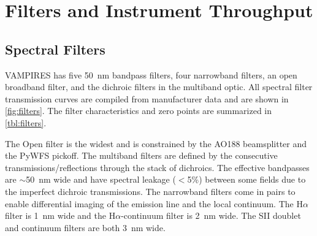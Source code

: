 \section{Filters and Instrument Throughput}\label{sec:filters}

\subsection{Spectral Filters}
VAMPIRES has five \SI{50}{\nm} bandpass filters, four narrowband filters, an open broadband filter, and the dichroic filters in the multiband optic. All spectral filter transmission curves are compiled from manufacturer data and are shown in \autoref{fig:filters}. The filter characteristics and zero points are summarized in \autoref{tbl:filters}.

The Open filter is the widest and is constrained by the AO188 beamsplitter and the PyWFS pickoff. The multiband filters are defined by the consecutive transmissions/reflections through the stack of dichroics. The effective bandpasses are $\sim$\SI{50}{\nm} wide and have spectral leakage ($<$5\%) between some fields due to the imperfect dichroic transmissions. The narrowband filters come in pairs to enable differential imaging of the emission line and the local continuum. The H$\alpha$ filter is \SI{1}{\nm} wide and the H$\alpha$-continuum filter is \SI{2}{\nm} wide. The SII doublet and continuum filters are both \SI{3}{\nm} wide.

